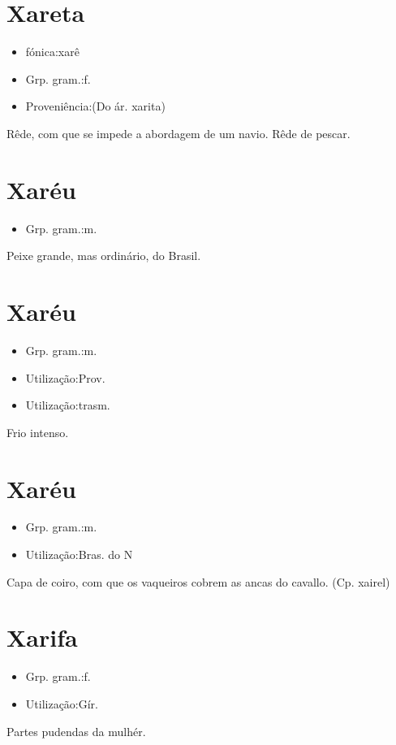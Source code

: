 \section{Xareta}
\begin{itemize}
\item {fónica:xarê}
\end{itemize}
\begin{itemize}
\item {Grp. gram.:f.}
\end{itemize}
\begin{itemize}
\item {Proveniência:(Do ár. \textunderscore xarita\textunderscore )}
\end{itemize}
Rêde, com que se impede a abordagem de um navio.
Rêde de pescar.
\section{Xaréu}
\begin{itemize}
\item {Grp. gram.:m.}
\end{itemize}
Peixe grande, mas ordinário, do Brasil.
\section{Xaréu}
\begin{itemize}
\item {Grp. gram.:m.}
\end{itemize}
\begin{itemize}
\item {Utilização:Prov.}
\end{itemize}
\begin{itemize}
\item {Utilização:trasm.}
\end{itemize}
Frio intenso.
\section{Xaréu}
\begin{itemize}
\item {Grp. gram.:m.}
\end{itemize}
\begin{itemize}
\item {Utilização:Bras. do N}
\end{itemize}
Capa de coiro, com que os vaqueiros cobrem as ancas do cavallo.
(Cp. \textunderscore xairel\textunderscore )
\section{Xarifa}
\begin{itemize}
\item {Grp. gram.:f.}
\end{itemize}
\begin{itemize}
\item {Utilização:Gír.}
\end{itemize}
Partes pudendas da mulhér.
